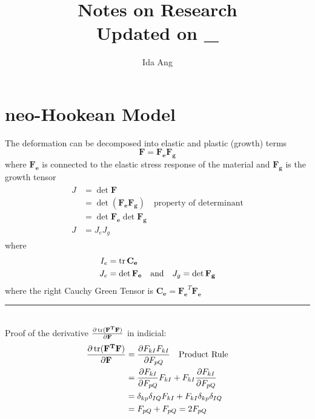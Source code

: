 \documentclass[12pt,3p]{article}
\numberwithin{equation}{section}
\begin{document}
\title{Notes on Research \\
	\large{Updated on \_}}
\author{Ida Ang}
\date{\vspace{-5ex}}
\maketitle

\tableofcontents
\newpage

\section{neo-Hookean Model}
The deformation can be decomposed into elastic and plastic (growth) terms 
\begin{equation}\label{DefMulti}
\mathbf{F} = \mathbf{F_e} \mathbf{F_g}
\end{equation}
where $\mathbf{F_e}$ is connected to the elastic stress response of the material and $\mathbf{F_g}$ is the growth tensor 
\begin{align}\label{JMulti}
\begin{split}
J &= \det \mathbf{F} \\
   &= \det (\mathbf{F_e} \mathbf{F_g}) \quad \text{property of determinant} \\
   &= \det \mathbf{F_e} \det \mathbf{F_g} \\
J &= J_e J_g 
\end{split}
\end{align}
where 
\begin{align}\label{ThirdInvariant}
I_e &= \tr \mathbf{C_e} \\
J_e &= \det \mathbf{F_e} \quad \text{and} \quad J_g = \det \mathbf{F_g}
\end{align}
where the right Cauchy Green Tensor is $\mathbf{C_e} = \mathbf{F_e}^T \mathbf{F_e}$ \\
\noindent\rule{19cm}{0.5pt} \\ %
Proof of the derivative $\pdv{\trace(\mathbf{F^T} \mathbf{F})}{\mathbf{F}}$ in indicial: 
\begin{align*}
\pdv{\trace(\mathbf{F^T} \mathbf{F})}{\mathbf{F}} &= \pdv{F_{kI} F_{kI}}{F_{pQ}} \quad \text{Product Rule}\\ 
									&= \pdv{F_{kI}}{F_{pQ}} F_{kI} + F_{kI} \pdv{F_{kI}}{F_{pQ}} \\
									&= \delta_{kp} \delta_{IQ} F_{kI} + F_{kI} \delta_{kp} \delta_{IQ} \\
									&= F_{pQ} + F_{pQ} = 2 F_{pQ}
\end{align*}
\end{document}
